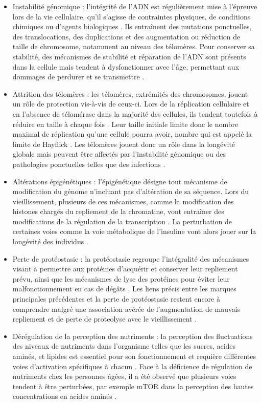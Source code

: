 \begin{itemize}
    \item Instabilité génomique : l'intégrité de l'ADN est régulièrement mise à l'épreuve lors de la vie cellulaire, qu'il s'agisse de contraintes physiques, de conditions chimiques ou d'agents biologiques \cite{Moskalev2013Mar}. Ils entraînent des mutations ponctuelles, des translocations, des duplications et des augmentation ou réduction de taille de chromosome, notamment au niveau des télomères. Pour conserver sa stabilité, des mécanismes de stabilité et réparation de l'ADN sont présents dans la cellule mais tendent à dysfonctionner avec l'âge, permettant aux dommages de perdurer et se transmettre \cite{Lord2012Jan}. 
    \item Attrition des télomères : les télomères, extrémités des chromosomes, jouent un rôle de protection vis-à-vis de ceux-ci. Lors de la réplication cellulaire et en l'absence de télomérase dans la majorité des cellules, ils tendent toutefois à réduire en taille à chaque fois \cite{Lopez-Otin2013}. Leur taille initiale limite donc le nombre maximal de réplication qu'une cellule pourra avoir, nombre qui est appelé la limite de Hayflick \cite{Hayflick1961Dec}. Les télomères jouent donc un rôle dans la longévité globale mais peuvent être affectés par l'instabilité génomique ou des pathologies ponctuelles telles que des infections \cite{Ilmonen2008May}.
    \item Altérations épigénétiques : l'épigénétique désigne tout mécanisme de modification du génome n'incluant pas d'altération de sa séquence. Lors du vieillissement, plusieurs de ces mécanismes, comme la modification des histones chargés du repliement de la chromatine, vont entraîner des modifications de la régulation de la transcription \cite{Fraga2007Aug}. La perturbation de certaines voies comme la voie métabolique de l'insuline vont alors jouer sur la longévité des individus \cite{Jin2011Aug}.
    \item Perte de protéostasie : la protéostasie regroupe l'intégralité des mécanismes visant à permettre aux protéines d'acquérir et conserver leur repliement prévu, ainsi que les mécanismes de lyse des protéines pour éviter leur malfonctionnement en cas de dégâts \cite{Koga2011Apr}. Les liens précis entre les marques principales précédentes et la perte de protéostasie restent encore à comprendre malgré une association avérée de l'augmentation de mauvais repliement et de perte de proteolyse avec le vieillissement \cite{Koga2011Apr}.
    \item Dérégulation de la perception des nutriments : la perception des fluctuations des niveaux de nutriments dans l'organisme telles que les sucres, acides aminés, et lipides est essentiel pour son fonctionnement et requière différentes voies d'activation spécifiques à chacun \cite{Houtkooper2010Jul}. Face à la déficience de régulation de nutriments chez les personnes âgées, il a été observé que plusieurs voies tendent à être perturbées, par exemple mTOR dans la perception des hautes concentrations en acides aminés \cite{Laplante2012Apr}.

\end{itemize}
